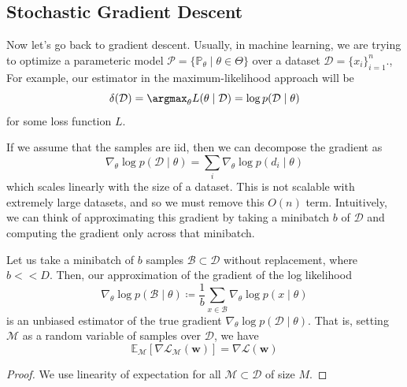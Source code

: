\subsection{Stochastic Gradient Descent} 

  Now let's go back to gradient descent. Usually, in machine learning, we are trying to optimize a parameteric model $\mathcal{P} = \{ \mathbb{P}_\theta \mid \theta \in \Theta\}$ over a dataset $\mathcal{D} = \{x_i\}_{i=1}^n$., For example, our estimator in the maximum-likelihood approach will be 
  \begin{equation}
    \delta(\mathcal{D}) = \argmax_{\theta} L(\theta \mid \mathcal{D}) = \log p(\mathcal{D} \mid \theta)
  \end{equation}
  for some loss function $L$. 

  If we assume that the samples are iid, then we can decompose the gradient as 
  \begin{equation}
    \nabla_\theta \log{p(\mathcal{D} \mid \theta)} = \sum_i \nabla_\theta \log{p(d_i \mid \theta)}
  \end{equation}
  which scales linearly with the size of a dataset. This is not scalable with extremely large datasets, and so we must remove this $O(n)$ term. Intuitively, we can think of approximating this gradient by taking a minibatch $b$ of $\mathcal{D}$ and computing the gradient only across that minibatch. 

  \begin{theorem}
    Let us take a minibatch of $b$ samples $\mathcal{B} \subset \mathcal{D}$ without replacement, where $b << D$. Then, our approximation of the gradient of the log likelihood
    \begin{equation}
       \nabla_\theta \log{p (\mathcal{B} \mid \theta)} \coloneqq \frac{1}{b} \sum_{x \in \mathcal{B}} \nabla_\theta \log{p(x \mid \theta)}
    \end{equation}
    is an unbiased estimator of the true gradient $\nabla_\theta \log{p(\mathcal{D} \mid \theta)}$. That is, setting $\mathcal{M}$ as a random variable of samples over $\mathcal{D}$, we have 
    \begin{equation}
      \mathbb{E}_{\mathcal{M}} [\nabla \mathcal{L}_{\mathcal{M}} (\mathbf{w})] = \nabla \mathcal{L} (\mathbf{w})
    \end{equation}
  \end{theorem}
  \begin{proof}
    We use linearity of expectation for all $\mathcal{M} \subset \mathcal{D}$ of size $M$. 
  \end{proof} 

